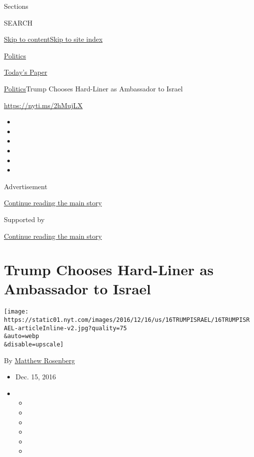 Sections

SEARCH

\protect\hyperlink{site-content}{Skip to
content}\protect\hyperlink{site-index}{Skip to site index}

\href{https://www.nytimes.com/section/politics}{Politics}

\href{https://myaccount.nytimes.com/auth/login?response_type=cookie\&client_id=vi}{}

\href{https://www.nytimes.com/section/todayspaper}{Today's Paper}

\href{/section/politics}{Politics}\textbar{}Trump Chooses Hard-Liner as
Ambassador to Israel

\url{https://nyti.ms/2hMujLX}

\begin{itemize}
\item
\item
\item
\item
\item
\item
\end{itemize}

Advertisement

\protect\hyperlink{after-top}{Continue reading the main story}

Supported by

\protect\hyperlink{after-sponsor}{Continue reading the main story}

\hypertarget{trump-chooses-hard-liner-as-ambassador-to-israel}{%
\section{Trump Chooses Hard-Liner as Ambassador to
Israel}\label{trump-chooses-hard-liner-as-ambassador-to-israel}}

\texttt{[image: https://static01.nyt.com/images/2016/12/16/us/16TRUMPISRAEL/16TRUMPISRAEL-articleInline-v2.jpg?quality=75\\\&auto=webp\\\&disable=upscale]}

By \href{http://www.nytimes.com/by/matthew-rosenberg}{Matthew Rosenberg}

\begin{itemize}
\item
  Dec. 15, 2016
\item
  \begin{itemize}
  \item
  \item
  \item
  \item
  \item
  \item
  \end{itemize}
\end{itemize}


